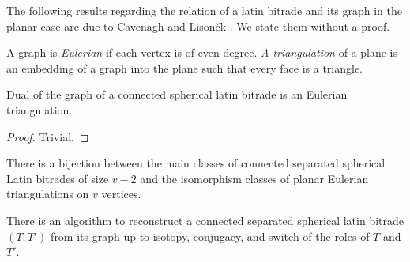 The following results regarding the relation of a latin bitrade and its graph in the planar case are due to Cavenagh and Lisoněk \cite{CavenaghLisonek08}. We state them without a proof.

\begin{defn}
A graph is \emph{Eulerian} if each vertex is of even degree. \emph{A triangulation} of a plane is an embedding of a graph into the plane such that every face is a triangle.
\end{defn}

\begin{lem}
Dual of the graph of a connected spherical latin bitrade is an Eulerian triangulation.
\end{lem}
\begin{proof}
Trivial.
\end{proof}

\begin{thm}
\label{thm:connected-spherical-separated}
There is a bijection between the main classes of connected separated spherical Latin bitrades of size $v-2$ and the isomorphism classes of planar Eulerian triangulations on $v$ vertices.
\end{thm}%

\begin{cor}
\label{cor:connected-spherical-separated}
There is an algorithm to reconstruct a connected separated spherical latin bitrade $(T,T')$ from its graph up to isotopy, conjugacy, and switch of the roles of $T$ and $T'$.
\end{cor}%




